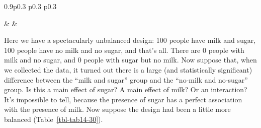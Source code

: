 \documentclass[
  a4paper,
]{book}
\begin{document}
\begin{table}[ht]
\begin{centerbox}
\begin{threeparttable}
\begin{tabularx}{0.9\textwidth}{p{} p{} p{}}
\hhline{}

 &
 &
 \tabularnewline[-0.5pt]


\end{tabularx} 

\end{threeparttable}\par\end{centerbox}

\end{table}
 

Here we have a spectacularly unbalanced design: 100 people have milk and
sugar, 100 people have no milk and no sugar, and that's all. There are 0
people with milk and no sugar, and 0 people with sugar but no milk. Now
suppose that, when we collected the data, it turned out there is a large
(and statistically significant) difference between the ``milk and
sugar'' group and the ``no-milk and no-sugar'' group. Is this a main
effect of sugar? A main effect of milk? Or an interaction? It's
impossible to tell, because the presence of sugar has a perfect
association with the presence of milk. Now suppose the design had been a
little more balanced (Table~\ref{tbl-tab14-30}).

\hypertarget{tbl-tab14-30}{}
 
  \providecommand{\huxb}[2]{\arrayrulecolor[RGB]{#1}\global\arrayrulewidth=#2pt}
  \providecommand{\huxvb}[2]{\color[RGB]{#1}\vrule width #2pt}
  \providecommand{\huxtpad}[1]{\rule{0pt}{#1}}
  \providecommand{\huxbpad}[1]{\rule[-#1]{0pt}{#1}}
\end{document}
